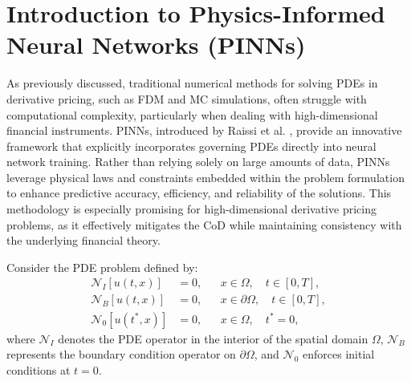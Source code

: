 \documentclass[12pt]{report} %
\theoremstyle{plain}           %
\theoremstyle{definition}      %
\theoremstyle{remark}          %
\begin{document}
\section{Introduction to Physics-Informed Neural Networks (PINNs)}
As previously discussed, traditional numerical methods for solving PDEs in 
derivative pricing, such as FDM and MC simulations, 
often struggle with computational complexity, particularly when dealing with 
high-dimensional financial instruments. PINNs, introduced by Raissi et al. \cite{RAISSI2019686}, 
provide an innovative framework that explicitly incorporates governing PDEs directly into neural 
network training. Rather than relying solely on large amounts of data, PINNs leverage physical 
laws and constraints embedded within the problem formulation to enhance predictive accuracy, 
efficiency, and reliability of the solutions. This methodology is especially promising for 
high-dimensional derivative pricing problems, as it effectively mitigates the 
CoD while maintaining consistency with the underlying financial theory.

Consider the PDE problem defined by:
\begin{equation}
	\begin{aligned}
	\mathcal{N}_I[u(t,x)] &= 0, && x\in\Omega,\quad t\in [0,T], \\
	\mathcal{N}_B[u(t,x)] &= 0, && x\in\partial\Omega,\quad t\in [0,T], \\
	\mathcal{N}_0[u(t^*,x)] &= 0, && x\in\Omega,\quad t^*=0,
	\end{aligned}
	\label{eq:PDE_conditions}
\end{equation}
where \(\mathcal{N}_I\) denotes the PDE operator in the interior of the spatial 
domain \(\Omega\), \(\mathcal{N}_B\) represents the boundary condition operator 
on \(\partial\Omega\), and \(\mathcal{N}_0\) enforces initial conditions at \(t=0\).
\end{document}
